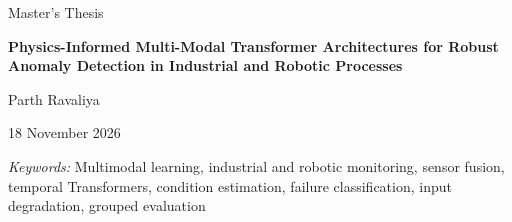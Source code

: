 \documentclass[12pt,a4paper,oneside]{report}
\newcommand{\thesistitle}{Physics-Informed Multi-Modal Transformer Architectures for
Robust Anomaly Detection in Industrial and Robotic Processes}
\begin{document}
\ifdefined\ThesisReviewCopy
\else
\hypersetup{pageanchor=false}
\begin{titlepage}
\centering
\vspace*{17mm}
{\large Master's Thesis\par}
\vspace{17mm}
{\LARGE\bfseries \thesistitle\par}
\vspace{23mm}
{\Large Parth Ravaliya\par}
\vfill
{\large 18 November 2026\par}
\vspace{8mm}
\end{titlepage}
\hypersetup{pageanchor=true}
\fi
\ThesisAbstractHeading
{}
\begingroup\apaprose
\noindent

\textit{Keywords:} Multimodal learning, industrial and robotic monitoring,
sensor fusion, temporal Transformers, condition estimation, failure classification,
input degradation, grouped evaluation\par
\endgroup
\clearpage
\ifdefined\ThesisReviewCopy\else
\tableofcontents\listoffigures\listoftables
\clearpage{}
\fi
\apaprose




\ifdefined\ThesisReviewCopy\else

\clearpage
\printbibliography[heading=bibintoc,title={References}]
\appendix









\fi
\end{document}
